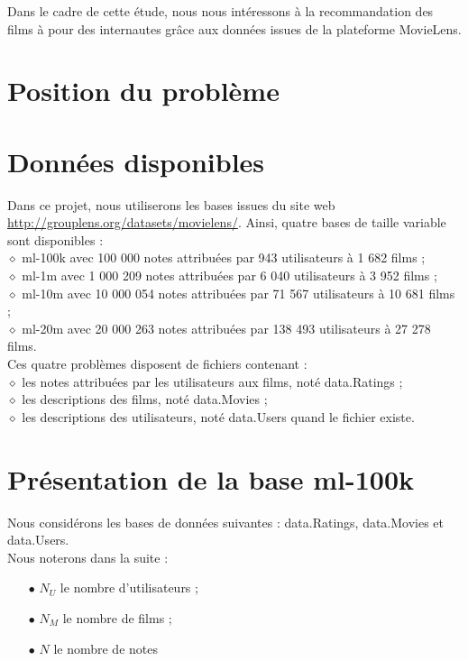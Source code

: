\documentclass[a4paper, 11pt]{book}
\begin{document}
Dans le cadre de cette étude, nous nous intéressons à la recommandation des films à pour des internautes grâce aux données issues de la plateforme MovieLens.
 
 \section{Position du problème}
 
 \section{Données disponibles}

Dans ce projet, nous utiliserons les bases issues du site web \url{http://grouplens.org/datasets/movielens/}. Ainsi, quatre bases de taille variable sont disponibles : \\
$\diamond$ ml-100k avec 100 000 notes attribuées par 943 utilisateurs à 1 682 films ; \\
$\diamond$ ml-1m avec 1 000 209 notes attribuées par 6 040 utilisateurs à 3 952 films ; \\
$\diamond$ ml-10m avec 10 000 054 notes attribuées par 71 567 utilisateurs à 10 681 films ; \\
$\diamond$ ml-20m avec 20 000 263 notes attribuées par 138 493 utilisateurs à 27 278 films. \\

Ces quatre problèmes disposent de fichiers contenant : \\
$\diamond$ les notes attribuées par les utilisateurs aux films, noté data.Ratings ; \\
$\diamond$ les descriptions des films, noté data.Movies ; \\
$\diamond$ les descriptions des utilisateurs, noté data.Users quand le fichier existe.

\section{Présentation de la base ml-100k}

Nous considérons les bases de données suivantes : data.Ratings, data.Movies et data.Users. \\

Nous noterons dans la suite : 
\begin{itemize}
\item[$\bullet$]  $N_U$ le nombre d'utilisateurs ; 
\item[$\bullet$]  $N_M$ le nombre de films ;
\item[$\bullet$]  $N$ le nombre de notes
\end{itemize}
\end{document}
